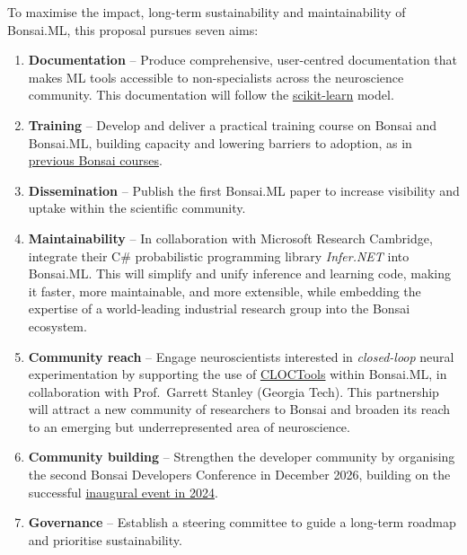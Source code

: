 To maximise the impact, long-term sustainability and maintainability of
Bonsai.ML, this proposal pursues seven aims:

\begin{enumerate}

  \item \textbf{Documentation} – Produce comprehensive, user-centred
      documentation that makes ML tools accessible to non-specialists across
        the neuroscience community. This documentation will follow the
        \href{https://scikit-learn.org}{scikit-learn} model.

  \item \textbf{Training} – Develop and deliver a practical training course on
      Bonsai and Bonsai.ML, building capacity and lowering barriers to
        adoption, as in \href{https://bonsai-rx.org/learn/}{previous Bonsai
        courses}.

  \item \textbf{Dissemination} – Publish the first Bonsai.ML paper to increase
      visibility and uptake within the scientific community.

  \item \textbf{Maintainability} – In collaboration with Microsoft Research
  Cambridge, integrate their C\# probabilistic programming library
  \emph{Infer.NET} into Bonsai.ML. This will simplify and unify inference and
  learning code, making it faster, more maintainable, and more extensible,
  while embedding the expertise of a world-leading industrial research group
  into the Bonsai ecosystem.

  \item \textbf{Community reach} – Engage neuroscientists interested in
      \emph{closed-loop} neural experimentation by supporting the use of
        \href{https://cloctools.github.io/}{CLOCTools} within Bonsai.ML, in
        collaboration with Prof.~Garrett Stanley (Georgia Tech). This
        partnership will attract a new community of researchers to Bonsai and
        broaden its reach to an emerging but underrepresented area of
        neuroscience.

  \item \textbf{Community building} – Strengthen the developer community by
      organising the second Bonsai Developers Conference in December 2026,
        building on the successful
        \href{https://conference.bonsai-rx.org/2024/}{inaugural event in 2024}.

  \item \textbf{Governance} – Establish a steering committee to guide a
      long-term roadmap and prioritise sustainability.

\end{enumerate}


